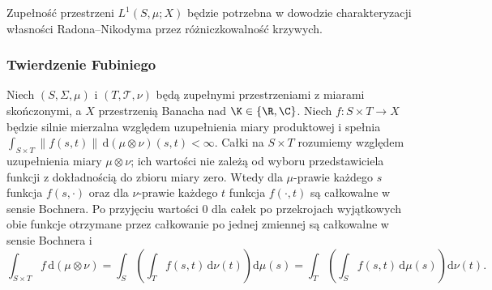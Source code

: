 Zupełność przestrzeni $L^1(S,\mu;X)$ będzie potrzebna
w dowodzie charakteryzacji własności Radona--Nikodyma
przez różniczkowalność krzywych.

\subsubsection{Twierdzenie Fubiniego}

\begin{twierdzenie}
\label{thm:bochner-fubini15b}
Niech $(S,\Sigma,\mu)$ i $(T,\mathcal T,\nu)$ będą
zupełnymi przestrzeniami z miarami skończonymi, a $X$
przestrzenią Banacha nad $\K\in\{\R,\C\}$.
Niech $f:S\times T\to X$ będzie silnie mierzalna względem
uzupełnienia miary produktowej i spełnia
$\int_{S\times T}\|f(s,t)\|\,\mathrm d(\mu\otimes\nu)(s,t)<\infty$.
Całki na $S\times T$ rozumiemy względem uzupełnienia
miary $\mu\otimes\nu$; ich wartości nie zależą od wyboru
przedstawiciela funkcji z dokładnością do zbioru miary zero.
Wtedy dla $\mu$-prawie każdego $s$ funkcja $f(s,\cdot)$
oraz dla $\nu$-prawie każdego $t$ funkcja $f(\cdot,t)$
są całkowalne w sensie Bochnera. Po przyjęciu wartości $0$
dla całek po przekrojach wyjątkowych obie funkcje otrzymane
przez całkowanie po jednej zmiennej są całkowalne w sensie
Bochnera i
\[
 \int_{S\times T}f\,\mathrm d(\mu\otimes\nu)
 =\int_S\left(\int_Tf(s,t)\,\mathrm d\nu(t)\right)\mathrm d\mu(s)
 =\int_T\left(\int_Sf(s,t)\,\mathrm d\mu(s)\right)\mathrm d\nu(t).
\]
\end{twierdzenie}
